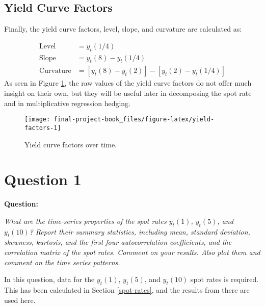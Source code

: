 \documentclass[openany]{book}
\theoremstyle{definition}
\theoremstyle{definition}
\theoremstyle{definition}
\theoremstyle{remark}
\begin{document}
\hypertarget{yield-curve-factors}{%
\section{Yield Curve Factors}\label{yield-curve-factors}}

Finally, the yield curve factors, level, slope, and curvature are
calculated as:

\[
\begin{aligned}
  \text{Level} &= y_t(1/4) \\
   \text{Slope} &= y_t(8) - y_t(1/4) \\
   \text{Curvature} &= [ y_t(8) - y_t(2) ]  - [ y_t(2) - y_t(1/4) ]
\end{aligned}
\] As seen in Figure \ref{fig:yield-factors}, the raw values of the
yield curve factors do not offer much insight on their own, but they
will be useful later in decomposing the spot rate and in multiplicative
regression hedging.

\small

\begin{figure}[H]

{\centering \texttt{[image: final-project-book\_files/figure-latex/yield-factors-1]} 

}

\caption{Yield curve factors over time.}\label{fig:yield-factors}
\end{figure}

\normalsize

\small

\normalsize

\hypertarget{q1}{%
\chapter{Question 1}\label{q1}}

\textbf{Question:}

\emph{What are the time-series properties of the spot rates \(y_t(1)\),
\(y_t(5)\), and \(y_t(10)\)? Report their summary statistics, including
mean, standard deviation, skewness, kurtosis, and the first four
autocorrelation coefficients, and the correlation matrix of the spot
rates. Comment on your results. Also plot them and comment on the time
series patterns.}

\small

\normalsize

In this question, data for the \(y_t(1)\), \(y_t(5)\), and \(y_t(10)\)
spot rates is required. This has been calculated in Section
\ref{spot-rates}, and the results from there are used here.
\end{document}

